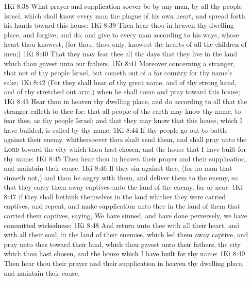 \vs 1Ki 8:38 What prayer and supplication soever be  by any man,  by all thy people Israel, which shall know every man the plague of his own heart, and spread forth his hands toward this house:
\vs 1Ki 8:39 Then hear thou in heaven thy dwelling place, and forgive, and do, and give to every man according to his ways, whose heart thou knowest; (for thou,  thou only, knowest the hearts of all the children of men;)
\vs 1Ki 8:40 That they may fear thee all the days that they live in the land which thou gavest unto our fathers.
\vs 1Ki 8:41 Moreover concerning a stranger, that  not of thy people Israel, but cometh out of a far country for thy name's sake;
\vs 1Ki 8:42 (For they shall hear of thy great name, and of thy strong hand, and of thy stretched out arm;) when he shall come and pray toward this house;
\vs 1Ki 8:43 Hear thou in heaven thy dwelling place, and do according to all that the stranger calleth to thee for: that all people of the earth may know thy name, to fear thee, as  thy people Israel; and that they may know that this house, which I have builded, is called by thy name.
\vs 1Ki 8:44 If thy people go out to battle against their enemy, whithersoever thou shalt send them, and shall pray unto the \textsc{Lord} toward the city which thou hast chosen, and  the house that I have built for thy name:
\vs 1Ki 8:45 Then hear thou in heaven their prayer and their supplication, and maintain their cause.
\vs 1Ki 8:46 If they sin against thee, (for  no man that sinneth not,) and thou be angry with them, and deliver them to the enemy, so that they carry them away captives unto the land of the enemy, far or near;
\vs 1Ki 8:47  if they shall bethink themselves in the land whither they were carried captives, and repent, and make supplication unto thee in the land of them that carried them captives, saying, We have sinned, and have done perversely, we have committed wickedness;
\vs 1Ki 8:48 And  return unto thee with all their heart, and with all their soul, in the land of their enemies, which led them away captive, and pray unto thee toward their land, which thou gavest unto their fathers, the city which thou hast chosen, and the house which I have built for thy name:
\vs 1Ki 8:49 Then hear thou their prayer and their supplication in heaven thy dwelling place, and maintain their cause,
